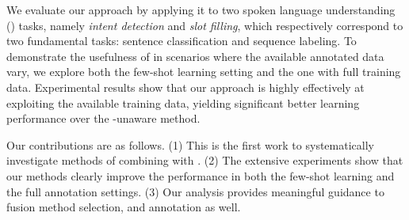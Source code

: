 %
We evaluate our approach by applying it to two spoken language understanding (\SLU) tasks, namely \emph{intent detection} and \emph{slot
filling}, which respectively correspond to two fundamental \NLP tasks: sentence classification and sequence labeling. To demonstrate the
usefulness of \REs in scenarios where the available annotated data vary, we explore both the few-shot learning setting and the one with
full training data. Experimental results show that our approach is highly effectively at exploiting the available training data, yielding
significant better learning performance over the \RE-unaware method.




Our contributions are as follows. (1) This is the first work to systematically investigate methods of combining \REs with \NNs. (2) The
extensive experiments show that our methods clearly improve the \NN performance in both the few-shot learning and the full annotation
settings. (3) Our analysis provides meaningful guidance to fusion method selection, and \RE annotation as well.
